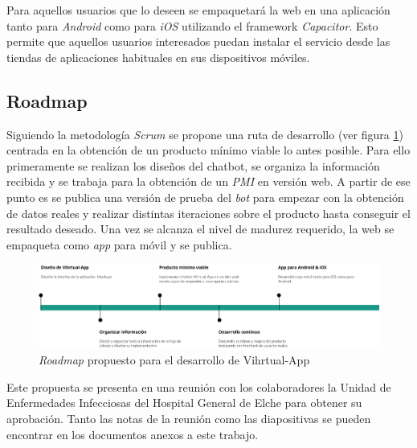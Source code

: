 Para aquellos usuarios que lo deseen se empaquetará la web en una aplicación tanto para \textit{Android} como para \textit{iOS} utilizando el framework \textit{Capacitor}. Esto permite que aquellos usuarios interesados puedan instalar el servicio desde las tiendas de aplicaciones habituales en sus dispositivos móviles.\\

\subsection{Roadmap}
Siguiendo la metodología \textit{Scrum} se propone una ruta de desarrollo (ver figura \ref{fig:roadmap desarrollo}) centrada en la obtención de un producto mínimo viable lo antes posible. Para ello primeramente se realizan los diseños del chatbot, se organiza la información recibida y se trabaja para la obtención de un \textit{PMI} en versión web. A partir de ese punto es se publica una versión de prueba del \textit{bot} para empezar con la obtención de datos reales  y realizar distintas iteraciones sobre el producto hasta conseguir el resultado deseado. Una vez se alcanza el nivel de madurez requerido, la web se empaqueta como \textit{app} para móvil y se publica.\\

\begin{figure}[htbp]
\centering
\includegraphics[scale=0.4]{../images/roadmap.png} 
\caption{\textit{Roadmap} propuesto para el desarrollo de Vihrtual-App}
\label{fig:roadmap desarrollo}
\end{figure}

Este propuesta se presenta en una reunión con los colaboradores la Unidad de Enfermedades Infecciosas del Hospital General de Elche para obtener su aprobación. Tanto las notas de la reunión como las diapositivas se pueden encontrar en los documentos anexos a este trabajo.\\